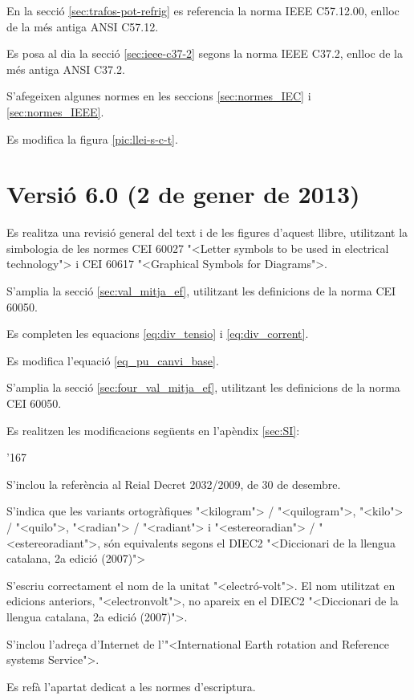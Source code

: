 En la secci\'{o} \ref{sec:trafos-pot-refrig} es referencia la norma  \textsf{IEEE C57.12.00}, enlloc de la m\'{e}s antiga \textsf{ANSI C57.12}.

Es posa al dia la secci\'{o} \ref{sec:ieee-c37-2} segons la norma \textsf{IEEE C37.2}, enlloc de la m\'{e}s antiga \textsf{ANSI C37.2}.

S'afegeixen algunes normes en les seccions \ref{sec:normes_IEC} i \ref{sec:normes_IEEE}.

Es modifica  la figura \ref{pic:llei-s-c-t}.


\section*{Versi\'{o} 6.0 (2 de gener de 2013)}

Es realitza una revisi\'{o} general del text i de les figures d'aquest  llibre, utilitzant la simbologia de les normes \textsf{CEI 60027}  {"<}Letter symbols to be used in electrical technology{">} i  \textsf{CEI 60617}  {"<}Graphical Symbols for Diagrams{">}.

S'amplia la secci\'{o} \ref{sec:val_mitja_ef}, utilitzant les definicions de la norma \textsf{CEI 60050}.

Es completen les equacions \eqref{eq:div_tensio} i \eqref{eq:div_corrent}.

Es modifica l'equaci\'{o} \eqref{eq_pu_canvi_base}.

S'amplia la secci\'{o}  \ref{sec:four_val_mitja_ef}, utilitzant les definicions de la norma \textsf{CEI 60050}.

Es realitzen les modificacions seg\"{u}ents en l'ap\`{e}ndix \ref{sec:SI}:
\begin{dinglist}{'167}
   \item  S'inclou la refer\`{e}ncia al Reial Decret 2032/2009, de 30 de desembre.
   \item S'indica que les variants ortogr\`{a}fiques  {"<}kilogram{">}  / {"<}quilogram{">}, {"<}kilo{">} / {"<}quilo{">}, {"<}radian{">} / {"<}radiant{">} i
   {"<}estereoradian{">} / {"<}estereoradiant{">}, s\'{o}n equivalents segons el DIEC2 {"<}Diccionari de la llengua catalana, 2a edici\'{o} (2007){">}
    \item S'escriu correctament el nom de la unitat {"<}electr\'{o}-volt{">}. El nom  utilitzat en edicions anteriors,   {"<}electronvolt{">}, no apareix en el DIEC2 {"<}Diccionari de la llengua catalana, 2a edici\'{o} (2007){">}.
    \item S'inclou l'adre\c{c}a d'Internet de l'{"<}International Earth rotation and Reference systems Service{">}.
     \item Es ref\`{a} l'apartat dedicat a les normes d'escriptura.
\end{dinglist}

